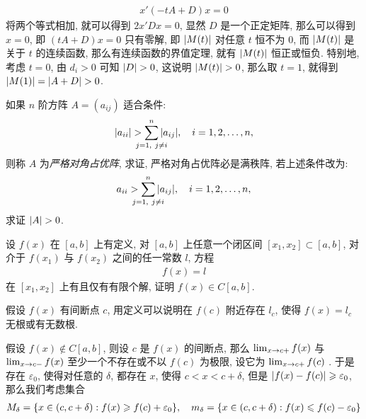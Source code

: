 \begin{exercise}[series=exer]
\begin{answer}
      \begin{align*}
          x'(-tA + D)x = 0
      \end{align*}
      将两个等式相加, 就可以得到 $ 2x'Dx = 0 $, 显然 $ D $ 是一个正定矩阵, 那么可以得到 $ x = 0 $, 即 $ (tA + D)x = 0 $ 只有零解, 即 $ \abs{M(t)} $ 对任意 $ t $ 恒不为 $ 0 $, 而 $ \abs{M(t)} $ 是关于 $ t $ 的连续函数, 那么有连续函数的界值定理, 就有 $ \abs{M(t)} $ 恒正或恒负. 特别地, 考虑 $ t = 0 $, 由 $ d_{i} > 0 $ 可知 $ \abs{D} > 0 $, 这说明 $ \abs{M(t)} > 0 $, 那么取 $ t = 1 $, 就得到 $ \abs{M(1)} = \abs{A + D} > 0 $.
  \end{answer}
  \item 如果 $ n $ 阶方阵 $ A = (a_{ij}) $ 适合条件:
  \begin{align*}
      \abs{a_{ii}} > \sum_{\mathclap{j = 1,\ j \ne i}}^{n} \abs{a_{ij}}, \quad i = 1, 2, \dots, n,
  \end{align*}
  则称 $ A $ 为\emph{严格对角占优阵}, 求证, 严格对角占优阵必是满秩阵, 若上述条件改为:
  \begin{align*}
      a_{ii} > \sum_{\mathclap{j = 1,\ j \ne i}}^{n} \abs{a_{ij}}, \quad i = 1, 2, \dots, n,
  \end{align*}
  求证 $ \abs{A} > 0 $.
  \item 设 $ f(x) $ 在 $ [a, b] $ 上有定义, 对 $ [a, b] $ 上任意一个闭区间 $ [x_{1}, x_{2}] \subset [a, b] $, 对介于 $ f(x_{1}) $ 与 $ f(x_{2}) $ 之间的任一常数 $ l $, 方程
  \begin{align*}
      f(x) = l
  \end{align*}
  在 $ [x_{1}, x_{2}] $ 上有且仅有有限个解, 证明 $ f(x) \in C[a, b] $.
  \begin{hint}
      假设 $ f(x) $ 有间断点 $ c $, 用定义可以说明在 $ f(c) $ 附近存在 $ l_{c} $, 使得 $ f(x) = l_{c} $ 无根或有无数根.
  \end{hint}
  \begin{answer}
      假设 $ f(x) \notin C[a, b] $, 则设 $ c $ 是 $ f(x) $ 的间断点, 那么 $ \lim_{x \to c+}f(x) $ 与 $ \lim_{x \to c-} f(x) $ 至少一个不存在或不以 $ f(c) $ 为极限, 设它为 $ \lim_{x \to c+}f(c) $ . 于是存在 $ \varepsilon_{0} $, 使得对任意的 $ \delta $, 都存在 $ x $, 使得 $ c < x < c + \delta $, 但是 $ \abs{f(x) - f(c)} \geqslant \varepsilon_{0} $, 那么我们考虑集合
      \begin{align*}
          M_{\delta} = \qty{x \in (c, c+\delta) : f(x) \geqslant f(c) + \varepsilon_{0}}, \quad m_{\delta} = \qty{x \in (c, c+\delta) : f(x) \leqslant f(c) - \varepsilon_{0}}
      \end{align*}

\end{answer}
\end{exercise}

